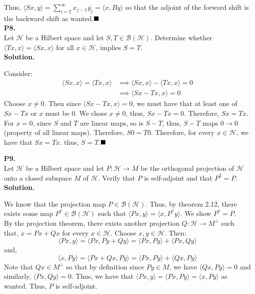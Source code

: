 \documentclass{article}
\begin{document}
    Thus, $\langle Sx,y\rangle = \sum_{i=2}^{\infty} x_{j-1}\overline{y_j} = \langle x,By\rangle$ so that the adjoint of the forward
    shift is the backward shift as wanted.$\hfill\blacksquare$\\

    \textbf{P8.}\\

    Let $\mathcal{H}$ be a Hilbert space and let $S,T\in\mathcal{B}(\mathcal{H})$. Determine whether $\langle Tx,x\rangle 
    =\langle Sx,x\rangle$ for all $x\in\mathcal{H}$, implies $S = T$.\\

    \textbf{Solution.}

    Consider:
    \begin{align*}
        \langle Sx,x\rangle = \langle Tx,x\rangle &\implies \langle Sx,x\rangle - \langle Tx,x\rangle = 0 \\
            &\implies \langle Sx-Tx,x\rangle = 0
    \end{align*}
    Choose $x\neq 0$. Then since $\langle Sx-Tx,x\rangle = 0$, we must have that at least one of $Sx-Tx$ or $x$ must be 0. We chose
    $x\neq 0$, thus, $Sx-Tx=0$. Therefore, $Sx = Tx$. For $x=0$, since $S$ and $T$ are linear maps, so is $S-T$, thus, $S-T$
    maps $0\to 0$ (property of all linear maps). Therefore, $S0 = T0$.
    Therefore, for every $x\in\mathcal{H}$, we have that $Sx=Tx$. thus, $S = T$.$\hfill\blacksquare$\\

    \newpage

    \textbf{P9.}\\

    Let $\mathcal{H}$ be a Hilbert space and let $P:\mathcal{H}\to M$ be the orthogonal projection of $\mathcal{H}$ onto a closed
    subspace $M$ of $\mathcal{H}$. Verify that $P$ is self-adjoint and that $P^2 = P$.\\

    \textbf{Solution.}

    We know that the projection map $P\in\mathcal{B}(\mathcal{H})$. Thus, by theorem 2.12, there exists some map $P^*\in\mathcal{B}
    (\mathcal{H})$ such that $\langle Px,y\rangle = \langle x,P^* y\rangle$. We show $P^* = P$.\\
    By the projection theorem, there exists another projection $Q:\mathcal{H}\to M^{\perp}$ such that,
    $x = Px + Qx$ for every $x\in\mathcal{H}$. Choose $x,y\in\mathcal{H}$. Then:
    \[ \langle Px,y\rangle = \langle Px, Py + Qy\rangle = \langle Px,Py\rangle + \langle Px,Qy\rangle \]
    and,
    \[ \langle x,Py\rangle = \langle Px + Qx,Py\rangle = \langle Px,Py\rangle + \langle Qx,Py\rangle \]
    Note that $Qx\in M^{\perp}$ so that by definition since $Py\in M$, we have $\langle Qx,Py\rangle = 0$ and similarly,
    $\langle Px,Qy\rangle = 0$. Thus, we have that $\langle Px,y\rangle = \langle Px,Py\rangle = \langle x,Py\rangle$ as wanted.
    Thus, $P$ is self-adjoint.\\
\end{document}
